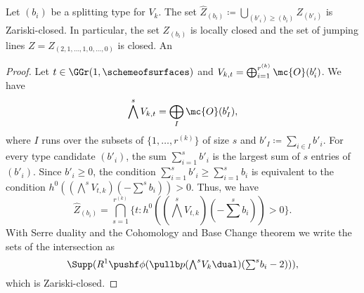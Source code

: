 \begin{remark}
	Let $(b_i)$ be a splitting type for $V_k$. The set $\widehat Z_{(b_i)} \coloneqq \bigcup_{(b'_i)\geq(b_i)} Z_{(b'_i)}$ is Zariski-closed. In particular, the set $Z_{(b_i)}$ is locally closed and the set of jumping lines $Z = Z_{(2,1,\dotsc,1,0,\dotsc,0)}$ is closed. An 
\end{remark}

\begin{proof}
Let $t\in \GGr(1,\schemeofsurfaces)$ and $V_{k,t} = \bigoplus_{i=1}^{r^{(k)}} \mc{O}(b'_i)$. We have
\[
\bigwedge^s V_{k,t} = \bigoplus_{I} \mc{O}(b_I'),
\]
where $I$ runs over the subsets of $\{1,\dotsc, r^{(k)}\}$ of size $s$ and $b'_I\coloneqq \sum_{i\in I} b'_i$.
For every type candidate $(b'_i)$, the sum $\sum_{i=1}^s b'_i$ is the largest sum of $s$ entries of $(b'_i)$. Since $b'_i \geq 0$, the condition $\sum_{i=1}^s b'_i \geq \sum_{i=1}^s b_i$ is equivalent to the condition $h^0((\textstyle{\bigwedge}^{s} V_{t,k})(-\textstyle{\sum}^s b_i)) > 0$. Thus, we have
\[
	\widehat Z_{(b_i)} = \bigcap_{s=1}^{r^{(k)}} \{t : h^0((\textstyle{\bigwedge}^{s} V_{t,k})(-\textstyle{\sum}^s b_i)) > 0\}.
\]
With Serre duality and the Cohomology and Base Change theorem we write the sets of the intersection as 
\[
	\Supp(R^1 \pushf \phi (\pullb p (\textstyle{\bigwedge}^{s} V_k\dual )(\textstyle{\sum}^s b_i - 2))),
\]
which is Zariski-closed.
\end{proof}